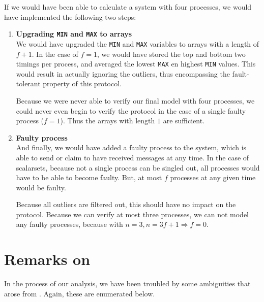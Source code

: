 \documentclass[a4paper,10pt]{article}
\newcommand{\newfinal}{our final model\xspace}
\begin{document}
If we would have been able to calculate a system with four processes, we would have implemented the following two steps:


\begin{enumerate}
\item \textbf{Upgrading \texttt{MIN} and \texttt{MAX} to arrays} \\
	We would have upgraded the \texttt{MIN} and \texttt{MAX} variables to arrays with a length of $f+1$. In the case of $f=1$, we would have stored the top and bottom two timings per process, and averaged the lowest \texttt{MAX} en highest \texttt{MIN} values. This would result in actually ignoring the outliers, thus encompassing the fault-tolerant property of this protocol.
	
	Because we were never able to verify \newfinal with four processes, we could never even begin to verify the protocol in the case of a single faulty process ($f=1$). Thus the arrays with length $1$ are sufficient.
	
\item \textbf{Faulty process} \\
	And finally, we would have added a faulty process to the system, which is able to send or claim to have received messages at any time. In the case of scalarsets, because not a single process can be singled out, all processes would have to be able to become faulty. But, at most $f$ processes at any given time would be faulty.
	
	Because all outliers are filtered out, this should have no impact on the protocol. Because we can verify at most three processes, we can not model any faulty processes, because with $n = 3, n = 3f+1 \Rightarrow f=0$.
	
\end{enumerate}

\section{Remarks on \cite{Aceto2004Notes}\label{sec:remarks}}

In the process of our analysis, we have been troubled by some ambiguities that arose from \cite{Aceto2004Notes}. Again, these are enumerated below.
\end{document}
